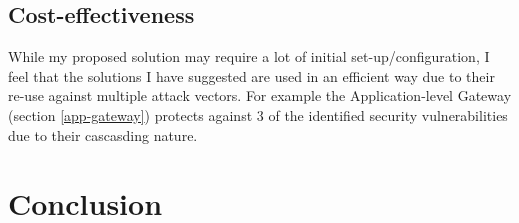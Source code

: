 \documentclass[11pt]{article}
\begin{document}
      \subsection{Cost-effectiveness}
        While my proposed solution may require a lot of initial set-up/configuration, I feel that the solutions I have suggested are used in an efficient way due to their re-use against multiple attack vectors. For example the Application-level Gateway (section \ref{app-gateway}) protects against 3 of the identified security vulnerabilities due to their cascasding nature.

    \section{Conclusion}

  \newpage

  
  
\end{document}
